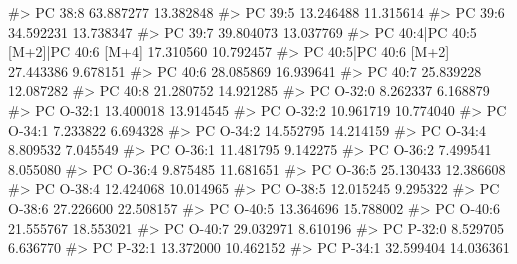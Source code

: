 \documentclass[
  letterpaper,
  DIV=11,
  numbers=noendperiod]{scrreprt}
\newenvironment{Shaded}{\begin{snugshade}}{\end{snugshade}}
\newcommand{\CommentTok}[1]{\textcolor[rgb]{0.37,0.37,0.37}{#1}}
\begin{document}
\begin{Shaded}
\begin{Highlighting}[]
\CommentTok{\#\textgreater{} PC 38:8                                   63.887277 13.382848}
\CommentTok{\#\textgreater{} PC 39:5                                   13.246488 11.315614}
\CommentTok{\#\textgreater{} PC 39:6                                   34.592231 13.738347}
\CommentTok{\#\textgreater{} PC 39:7                                   39.804073 13.037769}
\CommentTok{\#\textgreater{} PC 40:4|PC 40:5 [M+2]|PC 40:6 [M+4]       17.310560 10.792457}
\CommentTok{\#\textgreater{} PC 40:5|PC 40:6 [M+2]                     27.443386  9.678151}
\CommentTok{\#\textgreater{} PC 40:6                                   28.085869 16.939641}
\CommentTok{\#\textgreater{} PC 40:7                                   25.839228 12.087282}
\CommentTok{\#\textgreater{} PC 40:8                                   21.280752 14.921285}
\CommentTok{\#\textgreater{} PC O{-}32:0                                  8.262337  6.168879}
\CommentTok{\#\textgreater{} PC O{-}32:1                                 13.400018 13.914545}
\CommentTok{\#\textgreater{} PC O{-}32:2                                 10.961719 10.774040}
\CommentTok{\#\textgreater{} PC O{-}34:1                                  7.233822  6.694328}
\CommentTok{\#\textgreater{} PC O{-}34:2                                 14.552795 14.214159}
\CommentTok{\#\textgreater{} PC O{-}34:4                                  8.809532  7.045549}
\CommentTok{\#\textgreater{} PC O{-}36:1                                 11.481795  9.142275}
\CommentTok{\#\textgreater{} PC O{-}36:2                                  7.499541  8.055080}
\CommentTok{\#\textgreater{} PC O{-}36:4                                  9.875485 11.681651}
\CommentTok{\#\textgreater{} PC O{-}36:5                                 25.130433 12.386608}
\CommentTok{\#\textgreater{} PC O{-}38:4                                 12.424068 10.014965}
\CommentTok{\#\textgreater{} PC O{-}38:5                                 12.015245  9.295322}
\CommentTok{\#\textgreater{} PC O{-}38:6                                 27.226600 22.508157}
\CommentTok{\#\textgreater{} PC O{-}40:5                                 13.364696 15.788002}
\CommentTok{\#\textgreater{} PC O{-}40:6                                 21.555767 18.553021}
\CommentTok{\#\textgreater{} PC O{-}40:7                                 29.032971  8.610196}
\CommentTok{\#\textgreater{} PC P{-}32:0                                  8.529705  6.636770}
\CommentTok{\#\textgreater{} PC P{-}32:1                                 13.372000 10.462152}
\CommentTok{\#\textgreater{} PC P{-}34:1                                 32.599404 14.036361}

\end{Highlighting}
\end{Shaded}
\end{document}
